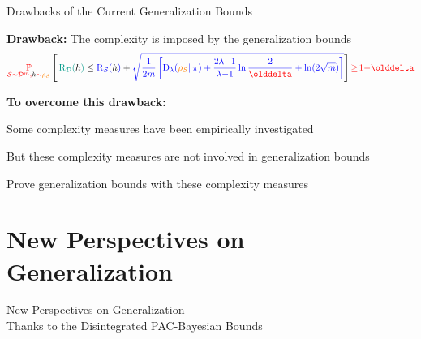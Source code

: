 \documentclass{slides}
\begin{document}
\begin{xframe}{Drawbacks of the Current Generalization Bounds}

\vfill

{\bf Drawback:} The complexity is imposed by the generalization bounds
\begin{align*}
    \red{\PP_{\dS\sim\D^{\m},\h\sim \AQ}}\LB\, \green{\Risk_{\D}(\h)} \le \blue{\Risk_{\dS}(\h)} + \blue{\sqrt{\frac{1}{2\m}\LB \Renyi_{\lambda}(\AQ\|\P)+ {\frac{2\lambda{-}1}{\lambda{-}1}}\ln\frac{2}{\delta} + \ln(2\sqrt{\m})\RB}} \RB \red{\ge\! 1{-}\delta}
\end{align*}

\vspace{0.7cm}

{\bf To overcome this drawback:}\\[0.3cm]
\begin{xitemize}
    \item Some complexity measures have been empirically investigated\\ 
    \citep{JiangNeyshaburMobahiKrishnanBengio2020, DziugaiteDrouinNealRajkumarCaballeroWangMitliagkasRoy2020, JiangNatekarSharma2021}
    \item But these complexity measures are not involved in generalization bounds
    \item Prove generalization bounds with these complexity measures
\end{xitemize}

\vfill

\end{xframe}


\section{New Perspectives on Generalization}
\begin{xtitle}

\vspace{3cm}

{\huge New Perspectives on Generalization}\\
{\normalsize Thanks to the Disintegrated PAC-Bayesian Bounds}

\vspace{3cm}

\end{xtitle}
\end{document}
